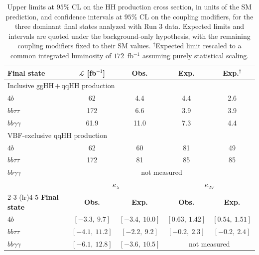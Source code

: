 %
\begin{table}[t]
\centering
\begin{tabular}{lcccc}
\toprule
\textbf{Final state} & \textbf{$\mathcal{L}$ [fb$^{-1}$]} & \textbf{Obs.} & \textbf{Exp.} & \textbf{Exp.$^{\dagger}$} \\
\midrule
\midrule
\multicolumn{5}{l}{Inclusive ggHH\,$+$\,qqHH production} \\
\midrule
$4b$             &  62   &  4.4 & 4.4 & 2.6 \\
$bb\tau\tau$     & 172   &  6.6 & 3.9 & 3.9 \\
$bb\gamma\gamma$ &  61.9 & 11.0 & 7.3 & 4.4 \\
\multicolumn{5}{l}{VBF-exclusive qqHH production} \\
\midrule
$4b$             &  62 & 60 & 81 & 49 \\
$bb\tau\tau$     & 172 & 81 & 85 & 85 \\
$bb\gamma\gamma$ & \multicolumn{4}{c}{not measured} \\
\midrule
\midrule
                     & \multicolumn{2}{c}{$\kappa_\lambda$} & \multicolumn{2}{c}{$\kappa_{2V}$} \\
\cmidrule(lr){2-3} \cmidrule(lr){4-5}
\textbf{Final state} & \textbf{Obs.} & \textbf{Exp.} & \textbf{Obs.} & \textbf{Exp.} \\
\midrule
\midrule
$4b$             & $[-3.3,\ 9.7]$  & $[-3.4,\ 10.0]$ & $[0.63,\ 1.42]$ & $[0.54,\ 1.51]$ \\
$bb\tau\tau$     & $[-4.1,\ 11.2]$ & $[-2.2,\ 9.2]$  & $[-0.2,\ 2.3]$  & $[-0.2,\ 2.4]$  \\
$bb\gamma\gamma$ & $[-6.1,\ 12.8]$ & $[-3.6,\ 10.5]$ & \multicolumn{2}{c}{not measured} \\
\bottomrule
\end{tabular}
\caption[Comparison of the CMS HH final states in Run 3]{%
Upper limits at $95\%$ CL on the HH production cross section, in units of the SM
prediction, and confidence intervals at $95\%$ CL on the coupling modifiers, for the
three dominant final states analyzed with Run 3 data. Expected limits and intervals
are quoted under the background-only hypothesis, with the remaining coupling
modifiers fixed to their SM values. $^{\dagger}$Expected limit rescaled to a common
integrated luminosity of $172$~fb$^{-1}$ assuming purely statistical
scaling.}
\label{tab:hh_run3_channels}
\end{table}



